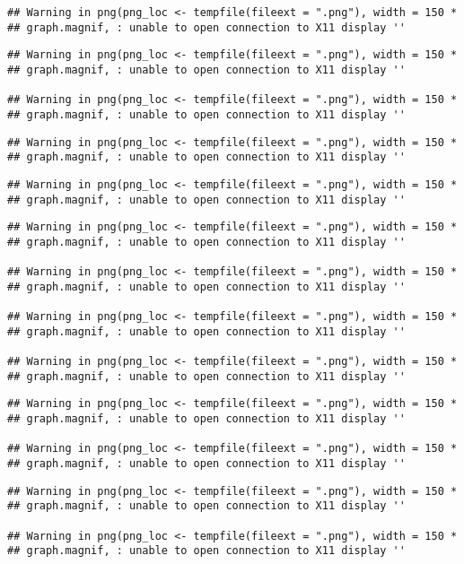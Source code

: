 \documentclass[]{article}
\begin{document}
\begin{verbatim}
## Warning in png(png_loc <- tempfile(fileext = ".png"), width = 150 *
## graph.magnif, : unable to open connection to X11 display ''
\end{verbatim}

\begin{verbatim}
## Warning in png(png_loc <- tempfile(fileext = ".png"), width = 150 *
## graph.magnif, : unable to open connection to X11 display ''

## Warning in png(png_loc <- tempfile(fileext = ".png"), width = 150 *
## graph.magnif, : unable to open connection to X11 display ''
\end{verbatim}

\begin{verbatim}
## Warning in png(png_loc <- tempfile(fileext = ".png"), width = 150 *
## graph.magnif, : unable to open connection to X11 display ''
\end{verbatim}

\begin{verbatim}
## Warning in png(png_loc <- tempfile(fileext = ".png"), width = 150 *
## graph.magnif, : unable to open connection to X11 display ''
\end{verbatim}

\begin{verbatim}
## Warning in png(png_loc <- tempfile(fileext = ".png"), width = 150 *
## graph.magnif, : unable to open connection to X11 display ''

## Warning in png(png_loc <- tempfile(fileext = ".png"), width = 150 *
## graph.magnif, : unable to open connection to X11 display ''

## Warning in png(png_loc <- tempfile(fileext = ".png"), width = 150 *
## graph.magnif, : unable to open connection to X11 display ''

## Warning in png(png_loc <- tempfile(fileext = ".png"), width = 150 *
## graph.magnif, : unable to open connection to X11 display ''
\end{verbatim}

\begin{verbatim}
## Warning in png(png_loc <- tempfile(fileext = ".png"), width = 150 *
## graph.magnif, : unable to open connection to X11 display ''

## Warning in png(png_loc <- tempfile(fileext = ".png"), width = 150 *
## graph.magnif, : unable to open connection to X11 display ''
\end{verbatim}

\begin{verbatim}
## Warning in png(png_loc <- tempfile(fileext = ".png"), width = 150 *
## graph.magnif, : unable to open connection to X11 display ''

## Warning in png(png_loc <- tempfile(fileext = ".png"), width = 150 *
## graph.magnif, : unable to open connection to X11 display ''
\end{verbatim}
\end{document}
